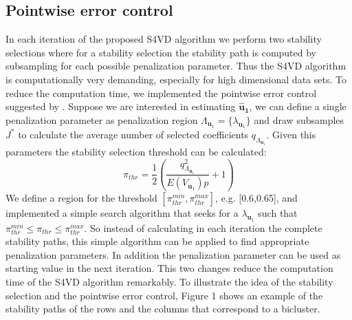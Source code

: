 \subsection{Pointwise error control}
In each iteration of the proposed S4VD algorithm we perform two stability selections where for a stability selection the stability path is computed by subsampling for each possible penalization parameter. Thus the S4VD algorithm is computationally very demanding, especially for high dimensional data sets. To reduce the computation time, we implemented the pointwise error control suggested by \citet{Meinshausen2010}. 
Suppose we are interested in estimating $\mathbf{\hat{u}_{1}}$, we can define a single penalization parameter as penalization region $\Lambda_{\mathbf{u}_{1}} = \{ \lambda_{\mathbf{u}_{1}} \}$ and draw subsamples $J^{*}$ to calculate the average number of selected coefficients $q_{\Lambda_{\mathbf{u}_{1}}}$. Given this parameters  the stability selection threshold can be calculated:
\begin{equation}
\pi_{thr} = \frac{1}{2} \left( \frac{q_{\Lambda_{\mathbf{u}_{1}}}^2}{E(V_{\mathbf{u}_{1}})p} + 1\right) 
\end{equation}
We define a region for the threshold $[\pi_{thr}^{min},\pi_{thr}^{max}]$, e.g. [0.6,0.65], and implemented a simple search algorithm that seeks for a $\lambda_{\mathbf{u}_{1}}$ such that $\pi_{thr}^{min}\leq\pi_{thr}\leq\pi_{thr}^{max}$. So instead of calculating in each iteration the complete stability paths,  
this simple algorithm can be applied to find appropriate penalization parameters. In addition the penalization parameter can be used as starting value in the next iteration. This two changes reduce the computation time of the S4VD algorithm remarkably. To illustrate the idea of the stability selection and the pointwise error control, Figure 1 shows an example of the stability paths of the rows and the columns that correspond to a bicluster.

